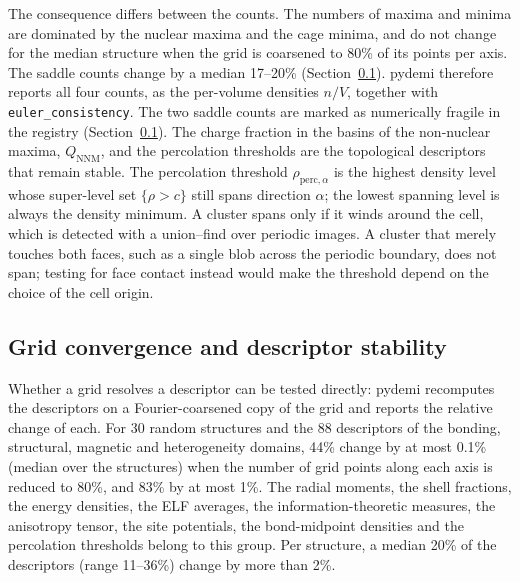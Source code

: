 \documentclass[11pt,a4paper]{article}
\begin{document}
The consequence differs between the counts. The numbers of maxima and minima
are dominated by the nuclear maxima and the cage minima, and do not change for
the median structure when the grid is coarsened to 80\% of its points per
axis. The saddle counts change by a median 17--20\%
(Section~\ref{sec:numerics:convergence}). pydemi therefore reports all four
counts, as the per-volume densities $n/V$, together with
\texttt{euler\_consistency}. The two saddle counts are marked as numerically
fragile in the registry (Section~\ref{sec:numerics:convergence}). The charge
fraction in the basins of the non-nuclear maxima, $Q_{\mathrm{NNM}}$, and the
percolation thresholds are the topological descriptors that remain stable. The
percolation threshold $\rho_{\mathrm{perc},\alpha}$ is the highest density
level whose super-level set $\{\rho>c\}$ still spans direction $\alpha$; the
lowest spanning level is always the density minimum. A cluster spans only if
it winds around the cell, which is detected with a union--find over periodic
images. A cluster that merely touches both faces, such as a single blob across
the periodic boundary, does not span; testing for face contact instead would
make the threshold depend on the choice of the cell origin.

\subsection{Grid convergence and descriptor stability}
\label{sec:numerics:convergence}

Whether a grid resolves a descriptor can be tested directly: pydemi recomputes
the descriptors on a Fourier-coarsened copy of the grid and reports the
relative change of each. For 30 random structures and the 88 descriptors of
the bonding, structural, magnetic and heterogeneity domains, 44\% change by at
most 0.1\% (median over the structures) when the number of grid points along
each axis is reduced to 80\%, and 83\% by at most 1\%. The radial moments,
the shell fractions, the energy densities, the ELF averages, the
information-theoretic measures, the anisotropy tensor, the site potentials,
the bond-midpoint densities and the percolation thresholds belong to this
group. Per structure, a median 20\% of the descriptors (range 11--36\%) change
by more than 2\%.
\end{document}
